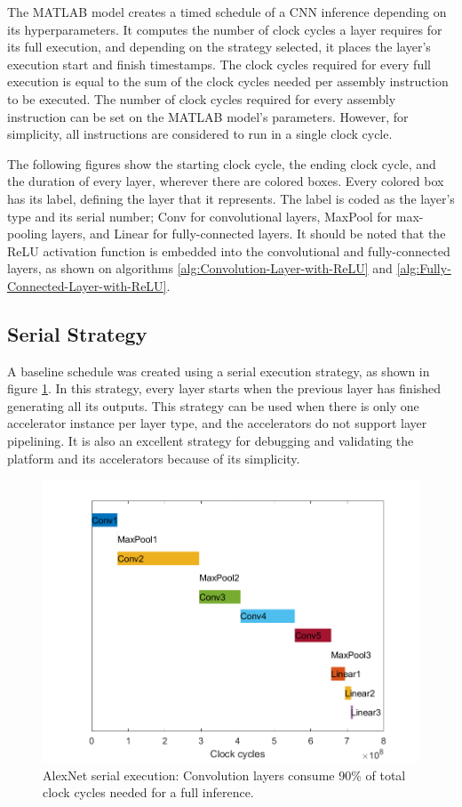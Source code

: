The MATLAB model creates a timed schedule of a CNN inference depending on its hyperparameters. It computes the number of clock cycles a layer requires for its full execution, and depending on the strategy selected, it places the layer's execution start and finish timestamps. The clock cycles required for every full execution is equal to the sum of the clock cycles needed per assembly instruction to be executed. The number of clock cycles required for every assembly instruction can be set on the MATLAB model's parameters. However, for simplicity, all instructions are considered to run in a single clock cycle.

The following figures show the starting clock cycle, the ending clock cycle, and the duration of every layer, wherever there are colored boxes. Every colored box has its label, defining the layer that it represents. The label is coded as the layer's type and its serial number; Conv for convolutional layers, MaxPool for max-pooling layers, and Linear for fully-connected layers. It should be noted that the ReLU activation function is embedded into the convolutional and fully-connected layers, as shown on algorithms \ref{alg:Convolution-Layer-with-ReLU} and \ref{alg:Fully-Connected-Layer-with-ReLU}.

\subsection{Serial Strategy}
A baseline schedule was created using a serial execution strategy, as shown in figure \ref{fig:serial-execution}. In this strategy, every layer starts when the previous layer has finished generating all its outputs. This strategy can be used when there is only one accelerator instance per layer type, and the accelerators do not support layer pipelining. It is also an excellent strategy for debugging and validating the platform and its accelerators because of its simplicity.

\begin{figure} [H]
	\centering
	\includegraphics[width=\textwidth]{../Images/Scheduling/Serial.png}
	\decoRule
	\caption[AlexNet serial execution]{AlexNet serial execution: Convolution layers consume 90\% of total clock cycles needed for a full inference.}
	\label{fig:serial-execution}
\end{figure}

